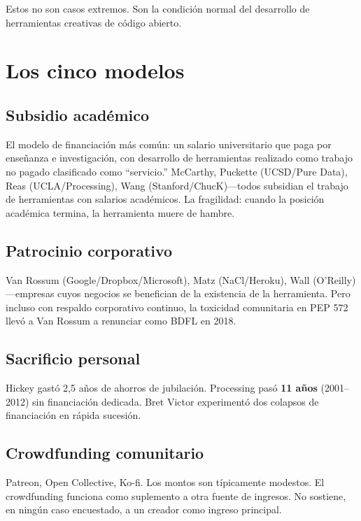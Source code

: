 \documentclass[10pt,letterpaper,twocolumn]{article}
\begin{document}
Estos no son casos extremos. Son la condición normal del desarrollo de herramientas creativas de código abierto.

\section{Los cinco modelos}

\subsection{Subsidio académico}

El modelo de financiación más común: un salario universitario que paga por enseñanza e investigación, con desarrollo de herramientas realizado como trabajo no pagado clasificado como ``servicio.'' McCarthy, Puckette (UCSD/Pure Data), Reas (UCLA/Processing), Wang (Stanford/ChucK)---todos subsidian el trabajo de herramientas con salarios académicos. La fragilidad: cuando la posición académica termina, la herramienta muere de hambre.

\subsection{Patrocinio corporativo}

Van Rossum (Google/Dropbox/Microsoft), Matz (NaCl/Heroku), Wall (O'Reilly)---empresas cuyos negocios se benefician de la existencia de la herramienta. Pero incluso con respaldo corporativo continuo, la toxicidad comunitaria en PEP 572 llevó a Van Rossum a renunciar como BDFL en 2018.

\subsection{Sacrificio personal}

Hickey gastó 2,5 años de ahorros de jubilación. Processing pasó \textbf{11 años} (2001--2012) sin financiación dedicada. Bret Victor experimentó dos colapsos de financiación en rápida sucesión.

\subsection{Crowdfunding comunitario}

Patreon, Open Collective, Ko-fi. Los montos son típicamente modestos. El crowdfunding funciona como suplemento a otra fuente de ingresos. No sostiene, en ningún caso encuestado, a un creador como ingreso principal.
\end{document}
